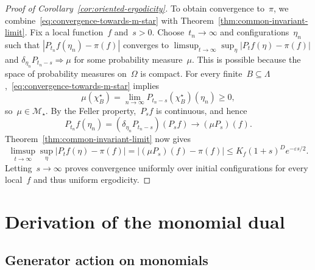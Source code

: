 \documentclass[EJP,preprint,NODS,nobera]{ejpecp}
\newcommand{\abs}[1]{\left|#1\right|}
\begin{document}
\begin{proof}[Proof of Corollary~\ref{cor:oriented-ergodicity}]
To obtain convergence to~$\pi$, we combine~\eqref{eq:convergence-towards-m-star}
with Theorem~\ref{thm:common-invariant-limit}.
Fix a local function~$f$ and~$s>0$. Choose~$t_n\to\infty$ and
configurations~$\eta_n$ such that
$\abs{P_{t_n}f(\eta_n)-\pi(f)}$ converges to
$\limsup_{t\to\infty}\sup_\eta\abs{P_tf(\eta)-\pi(f)}$ and
$\delta_{\eta_n}P_{t_n-s}\Rightarrow\mu$ for some probability measure~$\mu$. This is possible because the space of probability measures on~$\Omega$ is compact.
For every finite~$B\subseteq\Lambda$,~\eqref{eq:convergence-towards-m-star} implies
\begin{equation*}
\mu(\chi_B^\star)
=\lim_{n\to\infty}P_{t_n-s}(\chi_B^\star)(\eta_n)\geq0,
\end{equation*}
so~$\mu\in\mathcal M_\star$. By the Feller property,~$P_sf$ is continuous,
and hence
\begin{equation*}
P_{t_n}f(\eta_n)
=(\delta_{\eta_n}P_{t_n-s})(P_sf)
\longrightarrow(\mu P_s)(f).
\end{equation*}
Theorem~\ref{thm:common-invariant-limit} now gives
\begin{equation*}
\limsup_{t\to\infty}\sup_\eta\abs{P_tf(\eta)-\pi(f)}
=\abs{(\mu P_s)(f)-\pi(f)}
\leq K_f(1+s)^D e^{-\varepsilon s/2}.
\end{equation*}
Letting~$s\to\infty$ proves convergence uniformly over initial
configurations for every local~$f$ and thus uniform ergodicity.

\par
\end{proof}

\appendix


\iffalse
\section{Derivation of the monomial dual}
\label{app:dual-calculation}

\subsection{Generator action on monomials}
\label{app:generator-action}
\end{document}
